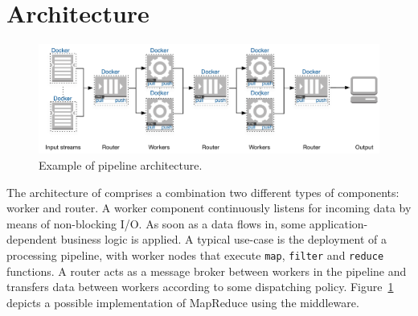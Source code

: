 \section{Architecture}
\label{sec:architecture}
\begin{figure}[!t]
  \centering
  \includegraphics[scale=0.7]{images/architecture_pipeline}
  \caption{Example of \SYS pipeline architecture.}
  \label{fig:architecture_pipeline}
\end{figure}


The architecture of \SYS{} comprises a combination two different types of components: \textsf{worker} and \textsf{router}.
A worker component continuously listens for incoming data by means of non-blocking I/O.
As soon as a data flows in, some application-dependent business logic is applied.
A typical use-case is the deployment of a processing pipeline, with worker nodes that execute \texttt{map}, \texttt{filter} and \texttt{reduce} functions.
A router acts as a message broker between workers in the pipeline and transfers data between workers according to some dispatching policy.
Figure~\ref{fig:architecture_pipeline} depicts a possible implementation of MapReduce using the \SYS middleware.


